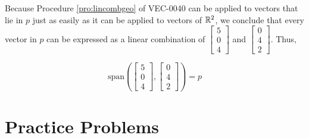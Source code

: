 \documentclass{ximera}
\begin{document}
\begin{example}
\begin{explanation}
Because Procedure \ref{pro:lincombgeo} of VEC-0040 can be applied to vectors that lie in $p$ just as easily as it can be applied to vectors of $\mathbb{R}^2$, we conclude that every vector in $p$ can be expressed as a linear combination of $\begin{bmatrix}5\\0\\4\end{bmatrix}$ and  $\begin{bmatrix}0\\4\\2\end{bmatrix}$.  Thus, 

$$\mbox{span}\left(\begin{bmatrix}5\\0\\4\end{bmatrix}, \begin{bmatrix}0\\4\\2\end{bmatrix}\right)=p$$

\end{explanation}
\end{example}

\section*{Practice Problems}
\end{document}

